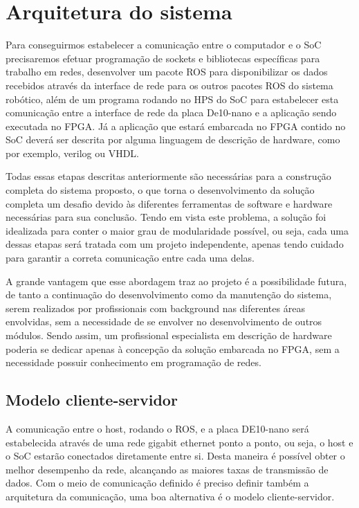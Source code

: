 \chapter{Arquitetura do sistema}

Para conseguirmos estabelecer a comunicação entre o computador e o SoC precisaremos efetuar programação de sockets e bibliotecas específicas para trabalho em redes, desenvolver um pacote ROS para disponibilizar os dados recebidos através da interface de rede para os outros pacotes ROS do sistema robótico, além de um programa rodando no HPS do SoC para estabelecer esta comunicação entre a interface de rede da placa De10-nano e a aplicação sendo executada no FPGA\@. Já a aplicação que estará embarcada no FPGA contido no SoC deverá ser descrita por alguma linguagem de descrição de hardware, como por exemplo, verilog ou VHDL\@.

Todas essas etapas descritas anteriormente são necessárias para a construção completa do sistema proposto, o que torna o desenvolvimento da solução completa um desafio devido às diferentes ferramentas de software e hardware necessárias para sua conclusão. Tendo em vista este problema, a solução foi idealizada para conter o maior grau de modularidade possível, ou seja, cada uma dessas etapas será tratada com um projeto independente, apenas tendo cuidado para garantir a correta comunicação entre cada uma delas.

A grande vantagem que esse abordagem traz ao projeto é a possibilidade futura, de tanto a continuação do desenvolvimento como da manutenção do sistema, serem realizados por profissionais com background nas diferentes áreas envolvidas, sem a necessidade de se envolver no desenvolvimento de outros módulos. Sendo assim, um profissional especialista em descrição de hardware poderia se dedicar apenas à concepção da solução embarcada no FPGA, sem a necessidade possuir conhecimento em programação de redes. 

\section{Modelo cliente-servidor}
A comunicação entre o host, rodando o ROS, e a placa DE10-nano será estabelecida através de uma rede gigabit ethernet ponto a ponto, ou seja, o host e o SoC estarão conectados diretamente entre si. Desta maneira é possível obter o melhor desempenho da rede, alcançando as maiores taxas de transmissão de dados. Com o meio de comunicação definido é preciso definir também a arquitetura da comunicação, uma boa alternativa é o modelo cliente-servidor.

